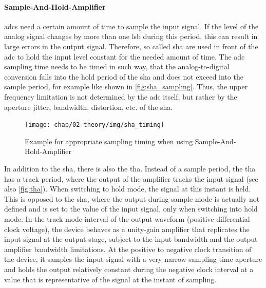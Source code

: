 \paragraph{Sample-And-Hold-Amplifier}
\Glspl{adc} need a certain amount of time to sample the input signal.
If the level of the analog signal changes by more than one \gls{lsb} during this period, this can result in large errors in the output signal.
Therefore, so called \gls{sha} are used in front of the \gls{adc} to hold the input level constant for the needed amount of time.
The \gls{adc} sampling time needs to be timed in such way, that the analog-to-digital conversion falls into the hold period of the \gls{sha} and does not exceed into the sample period, for example like shown in \autoref{fig:sha_sampling}. Thus, the upper frequency limitation is not determined by the \gls{adc} itself, but rather by the aperture jitter, bandwidth, distortion, etc. of the \gls{sha}. \cite{walt}

\begin{figure} [H]
	\centering
	\tikzexternaldisable
	\texttt{[image: chap/02-theory/img/sha\_timing]}  
	\caption{Example for appropriate sampling timing when using Sample-And-Hold-Amplifier}
	\label{fig:sha_timing}
	\tikzexternalenable
\end{figure}

In addition to the \gls{sha}, there is also the \gls{tha}.
Instead of a sample period, the \gls{tha} has a track period, where the output of the amplifier tracks the input signal (see also \autoref{fig:tha}).
When switching to hold mode, the signal at this instant is held. This is opposed to the \gls{sha}, where the output during sample mode is actually not defined and is set to the value of the input signal, only when switching into hold mode. In the track mode interval of the output waveform (positive differential clock voltage), the device behaves as a unity-gain amplifier that replicates the input signal at the output stage, subject to the input bandwidth and the output amplifier bandwidth limitations. At the positive to negative clock transition of the device, it samples the input signal with a very narrow sampling time aperture and holds the output relatively constant during the negative clock interval at a value that is representative of the signal at the instant of sampling. \cite{Reeder2019}

